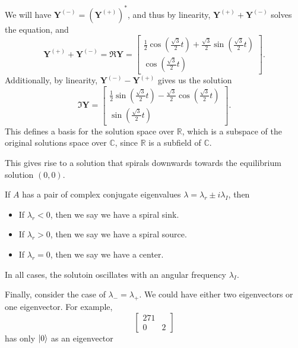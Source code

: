 We will have $\mathbf{Y}^{(-)}=\left( \mathbf{Y}^{(+)} \right) ^*$, and thus by linearity, $\mathbf{Y}^{(+)}+\mathbf{Y}^{(-)}$ solves the equation, and
\[
	\mathbf{Y}^{(+)}+\mathbf{Y}^{(-)}=\Re \mathbf{Y} = \begin{bmatrix} \frac{1}{2}\cos \left( \frac{\sqrt{3} }{2}t \right) + \frac{\sqrt{3}  }{2}\sin \left( \frac{\sqrt{3} }{2}t \right)  \\ \cos \left( \frac{\sqrt{3} }{2}t \right)  \end{bmatrix}
.\]
Additionally, by linearity, $\mathbf{Y}^{(-)}-\mathbf{Y}^{(+)}$ gives us the solution
\[
	\Im \mathbf{Y} = \begin{bmatrix} \frac{1}{2}\sin \left( \frac{\sqrt{3} }{2}t \right) -\frac{\sqrt{3}  }{2}\cos \left( \frac{\sqrt{3} }{2}t \right)  \\ \sin \left( \frac{\sqrt{3} }{2}t \right)  \end{bmatrix} 
.\]
This defines a basis for the solution space over $\mathbb{R}$, which is a subspace of the original solutions space over $\mathbb{C}$, since $\mathbb{R}$ is a subfield of $\mathbb{C}$.

This gives rise to a solution that spirals downwards towards the equilibrium solution $(0,0)$.

\begin{definition}\label{dfn:idk}
	If $A$ has a pair of complex conjugate eigenvalues $\lambda =\lambda_r\pm i\lambda_I$, then
	\begin{itemize}
		\item If $\lambda _r<0$, then we say we have a spiral sink.
		\item If $\lambda _r>0$, then we say we have a spiral source.
		\item If $\lambda _r=0$, then we say we have a center.
	\end{itemize}
	In all cases, the solutoin oscillates with an angular frequency $\lambda _I$.
\end{definition}

Finally, consider the case of $\lambda_{-}=\lambda _+$. We could have either two eigenvectors or one eigenvector. For example,
\[
	\begin{bmatrix} 271 \\ 0&2 \end{bmatrix} 
\]
has only $\lvert0\rangle$ as an eigenvector

